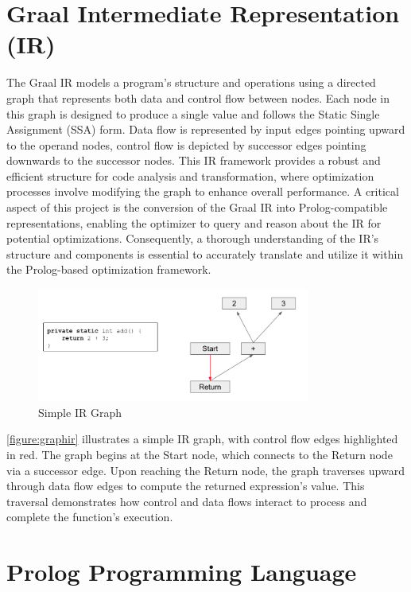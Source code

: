 \section{Graal Intermediate Representation (IR)}

The Graal IR \cite{Duboscq2013} models a program's structure and operations using a directed graph that represents both data and control flow between nodes. Each node in this graph is designed to produce a single value and follows the Static Single Assignment (SSA) \cite{Ron1991} form. Data flow is represented by input edges pointing upward to the operand nodes, control flow is depicted by successor edges pointing downwards to the successor nodes. This IR framework provides a robust and efficient structure for code analysis and transformation, where optimization processes involve modifying the graph to enhance overall performance. A critical aspect of this project is the conversion of the Graal IR into Prolog-compatible representations, enabling the optimizer to query and reason about the IR for potential optimizations. Consequently, a thorough understanding of the IR's structure and components is essential to accurately translate and utilize it within the Prolog-based optimization framework.

\begin{figure}[h]
    \centering
    \includegraphics[width=0.8\textwidth]{Packages/graphir.png}
    \caption{Simple IR Graph}
    \label{figure:graphir}
\end{figure}
\autoref{figure:graphir} illustrates a simple IR graph, with control flow edges highlighted in red. The graph begins at the Start node, which connects to the Return node via a successor edge. Upon reaching the Return node, the graph traverses upward through data flow edges to compute the returned expression’s value. This traversal demonstrates how control and data flows interact to process and complete the function's execution.

\section{Prolog Programming Language}

